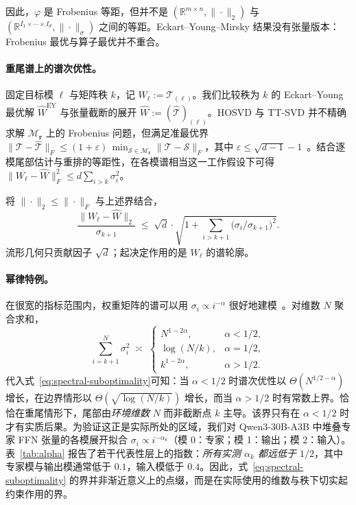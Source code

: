 \documentclass[11pt]{article}
\begin{document}
\begin{mainpart}
因此，$\varphi$ 是 Frobenius 等距，但并不是 $(\mathbb{R}^{m \times n}, \|\cdot\|_2)$ 与 $(\mathbb{R}^{I_1 \times \cdots \times I_d}, \|\cdot\|_\sigma)$ 之间的等距。Eckart--Young--Mirsky 结果没有张量版本：Frobenius 最优与算子最优并不重合。

\paragraph{重尾谱上的谱次优性。} 固定目标模 $\ell$ 与矩阵秩 $k$，记 $W_\ell := \mathcal{T}_{(\ell)}$。我们比较秩为 $k$ 的 Eckart--Young 最优解 $\widehat{W}^{\mathrm{EY}}$ 与张量截断的展开 $\widehat{W} := (\widehat{\mathcal{T}})_{(\ell)}$。HOSVD 与 TT-SVD 并不精确求解 $\mathcal{M}_\mathbf{r}$ 上的 Frobenius 问题，但满足准最优界 $\|\mathcal{T} - \widehat{\mathcal{T}}\|_F \leq (1 + \varepsilon)\, \min_{\mathcal{S} \in \mathcal{M}_\mathbf{r}} \|\mathcal{T} - \mathcal{S}\|_F$，其中 $\varepsilon \leq \sqrt{d-1} - 1$~\citep{oseledets2011tensor}。结合逐模尾部估计与重排的等距性，在各模谱相当这一工作假设下可得 $\|W_\ell - \widehat{W}\|_F^2 \leq d \sum_{i > k} \sigma_i^2$。

\begin{corollary}
\label{cor:spectral-gap}
将 $\|\cdot\|_2 \leq \|\cdot\|_F$ 与上述界结合，
\begin{equation}
\frac{\|W_\ell - \widehat{W}\|_2}{\sigma_{k+1}} \;\leq\; \sqrt{d} \cdot \sqrt{1 + \!\!\sum_{i > k+1}\! \bigl(\sigma_i / \sigma_{k+1}\bigr)^2}.
\label{eq:spectral-suboptimality}
\end{equation}
流形几何只贡献因子 $\sqrt{d}$；起决定作用的是 $W_\ell$ 的谱轮廓。
\end{corollary}

\paragraph{幂律特例。}
在很宽的指标范围内，权重矩阵的谱可以用 $\sigma_i \propto i^{-\alpha}$ 很好地建模~\citep{martin2021implicit}。对维数 $N$ 聚合求和，
\begin{equation}
\sum_{i = k+1}^{N} \sigma_i^2 \;\asymp\; \begin{cases}
N^{1 - 2\alpha}, & \alpha < 1/2, \\
\log(N/k), & \alpha = 1/2, \\
k^{1 - 2\alpha}, & \alpha > 1/2.
\end{cases}
\label{eq:power-law-tail}
\end{equation}
代入式~\eqref{eq:spectral-suboptimality}可知：当 $\alpha < 1/2$ 时谱次优性以 $\Theta(N^{1/2 - \alpha})$ 增长，在边界情形以 $\Theta(\sqrt{\log(N/k)})$ 增长，而当 $\alpha > 1/2$ 时有常数上界。恰恰在重尾情形下，尾部由\emph{环境维数} $N$ 而非截断点 $k$ 主导。该界只有在 $\alpha < 1/2$ 时才有实质后果。为验证这正是实际所处的区域，我们对 Qwen3-30B-A3B 中堆叠专家 FFN 张量的各模展开拟合 $\sigma_i \propto i^{-\alpha_k}$（模 0：专家；模 1：输出；模 2：输入）。表~\ref{tab:alpha} 报告了若干代表性层上的指数：\emph{所有实测 $\alpha_k$ 都远低于 $1/2$}，其中专家模与输出模通常低于 $0.1$，输入模低于 $0.4$。因此，式~\eqref{eq:spectral-suboptimality} 的界并非渐近意义上的点缀，而是在实际使用的维数与秩下切实起约束作用的界。



\end{mainpart}
\end{document}
